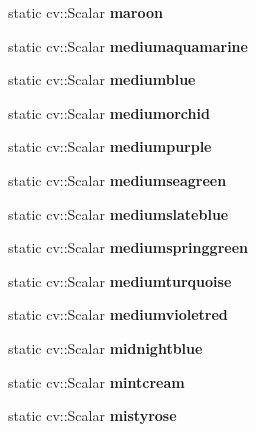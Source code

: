 \begin{DoxyCompactItemize}
static cv\+::\+Scalar {\bfseries maroon}
\item 
\mbox{\label{classColor_a0a17477028800dc0e913f5816c5c1674}} 
static cv\+::\+Scalar {\bfseries mediumaquamarine}
\item 
\mbox{\label{classColor_a1c3d6c52d197ea2706090c0d9a4aa189}} 
static cv\+::\+Scalar {\bfseries mediumblue}
\item 
\mbox{\label{classColor_afc3bed9c5ba6b123723eb30e847559d4}} 
static cv\+::\+Scalar {\bfseries mediumorchid}
\item 
\mbox{\label{classColor_a6f8326baa0a525302c6699407a409213}} 
static cv\+::\+Scalar {\bfseries mediumpurple}
\item 
\mbox{\label{classColor_ac1b99675800762a2ac6bb5e2956ff6df}} 
static cv\+::\+Scalar {\bfseries mediumseagreen}
\item 
\mbox{\label{classColor_a1aa040930f912533c0b4ea1962147cb0}} 
static cv\+::\+Scalar {\bfseries mediumslateblue}
\item 
\mbox{\label{classColor_ac908caa68f70b668230c33e2ec2986e8}} 
static cv\+::\+Scalar {\bfseries mediumspringgreen}
\item 
\mbox{\label{classColor_a04aed65e25f591456bc785e858c873e5}} 
static cv\+::\+Scalar {\bfseries mediumturquoise}
\item 
\mbox{\label{classColor_a6dc7bd0dbb76dde55f3e7ff732699417}} 
static cv\+::\+Scalar {\bfseries mediumvioletred}
\item 
\mbox{\label{classColor_ae5e06f91a0f23504137a3bc1dc4e62e7}} 
static cv\+::\+Scalar {\bfseries midnightblue}
\item 
\mbox{\label{classColor_a85aee9a4c3d180e4f1f52fced71258e0}} 
static cv\+::\+Scalar {\bfseries mintcream}
\item 
\mbox{\label{classColor_a40003d35fa0f5fd7ddc68314b27be573}} 
static cv\+::\+Scalar {\bfseries mistyrose}

\end{DoxyCompactItemize}
